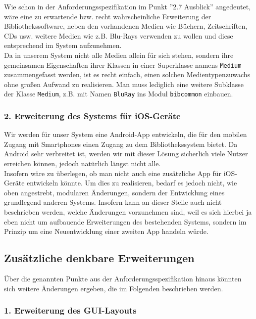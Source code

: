 \documentclass[fontsize=12pt,paper=a4,twoside]{scrartcl}
\begin{document}
Wie schon in der Anforderungsspezifikation im Punkt ''2.7 Ausblick'' angedeutet, wäre eine zu erwartende bzw. recht wahrscheinliche Erweiterung der Bibliothekssoftware, neben den vorhandenen Medien wie Büchern, Zeitschriften, CDs usw. weitere Medien wie z.B. Blu-Rays verwenden zu wollen und diese entsprechend im System aufzunehmen.\\
Da in unserem System nicht alle Medien allein für sich stehen, sondern ihre gemeinsamen Eigenschaften ihrer Klassen in einer Superklasse namens \texttt{Medium} zusammengefasst werden, ist es recht einfach, einen solchen Medientypenzuwachs ohne großen Aufwand zu realisieren. Man muss lediglich eine weitere Subklasse der Klasse \texttt{Medium}, z.B. mit Namen \texttt{BluRay} ins Modul \texttt{bibcommon} einbauen.

\subsubsection*{2. Erweiterung des Systems für iOS-Geräte}

Wir werden für unser System eine Android-App entwickeln, die für den mobilen Zugang mit Smartphones einen Zugang zu dem Bibliothekssystem bietet. Da Android sehr verbreitet ist, werden wir mit dieser Lösung sicherlich viele Nutzer erreichen können, jedoch natürlich längst nicht alle. \\
Insofern wäre zu überlegen, ob man nicht auch eine zusätzliche App für iOS-Geräte entwickeln könnte. Um dies zu realisieren, bedarf es jedoch nicht, wie oben angestrebt, modularen Änderungen, sondern der Entwicklung eines grundlegend anderen Systems. Insofern kann an dieser Stelle auch nicht beschrieben werden, welche Änderungen vorzunehmen sind, weil es sich hierbei ja eben nicht um aufbauende Erweiterungen des bestehenden Systems, sondern im Prinzip um eine Neuentwicklung einer zweiten App handeln  würde.

\subsection*{Zusätzliche denkbare Erweiterungen}

Über die genannten Punkte aus der Anforderungsspezifikation hinaus könnten sich weitere Änderungen ergeben, die im Folgenden beschrieben werden.

\subsubsection*{1. Erweiterung des GUI-Layouts}
\end{document}
